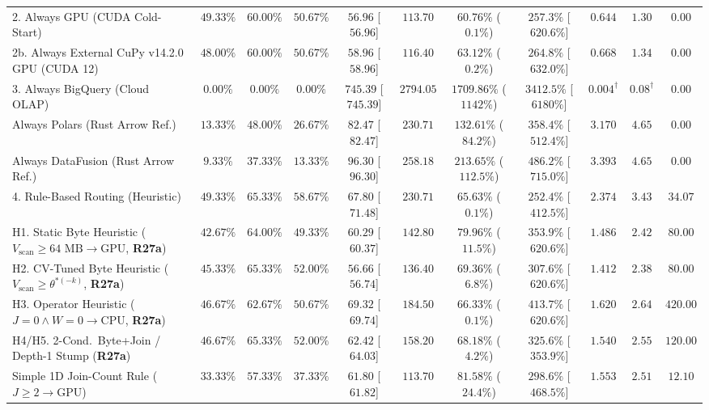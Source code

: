 \documentclass[10pt,a4paper]{article}
\newenvironment{fitasttable}{%
  \begin{lrbox}{\asttblbox}%
}{%
  \end{lrbox}%
  \sbox{\asttblboxB}{%
    \ifdim\wd\asttblbox>0.96\textwidth
      \resizebox{0.96\textwidth}{!}{\usebox{\asttblbox}}%
    \else
      \usebox{\asttblbox}%
    \fi
  }%
  \ifdim\ht\asttblboxB>0.72\textheight
    \resizebox{!}{0.72\textheight}{\usebox{\asttblboxB}}%
  \else
    \usebox{\asttblboxB}%
  \fi
}
\begin{document}
\begin{table}[!htbp]
\begin{fitasttable}
\begin{tabular}{@{}lcccccccccc@{}}
2. Always GPU (CUDA Cold-Start) & $49.33\%$ & $60.00\%$ & $50.67\%$ & $56.96$ [$56.96$] & $113.70$ & $60.76\%$ ($0.1\%$) & $257.3\%$ [$620.6\%$] & $0.644$ & $1.30$ & $0.00$ \\
2b. Always External CuPy v14.2.0 GPU (CUDA 12) & $48.00\%$ & $60.00\%$ & $50.67\%$ & $58.96$ [$58.96$] & $116.40$ & $63.12\%$ ($0.2\%$) & $264.8\%$ [$632.0\%$] & $0.668$ & $1.34$ & $0.00$ \\
3. Always BigQuery (Cloud OLAP) & $0.00\%$ & $0.00\%$ & $0.00\%$ & $745.39$ [$745.39$] & $2794.05$ & $1709.86\%$ ($1142\%$) & $3412.5\%$ [$6180\%$] & $0.004^{\dagger}$ & $0.08^{\dagger}$ & $0.00$ \\
Always Polars (Rust Arrow Ref.) & $13.33\%$ & $48.00\%$ & $26.67\%$ & $82.47$ [$82.47$] & $230.71$ & $132.61\%$ ($84.2\%$) & $358.4\%$ [$512.4\%$] & $3.170$ & $4.65$ & $0.00$ \\
Always DataFusion (Rust Arrow Ref.) & $9.33\%$ & $37.33\%$ & $13.33\%$ & $96.30$ [$96.30$] & $258.18$ & $213.65\%$ ($112.5\%$) & $486.2\%$ [$715.0\%$] & $3.393$ & $4.65$ & $0.00$ \\
4. Rule-Based Routing (Heuristic) & $49.33\%$ & $65.33\%$ & $58.67\%$ & $67.80$ [$71.48$] & $230.71$ & $65.63\%$ ($0.1\%$) & $252.4\%$ [$412.5\%$] & $2.374$ & $3.43$ & $34.07$ \\
H1. Static Byte Heuristic ($V_{\text{scan}}\ge 64\text{ MB}\rightarrow\text{GPU}$, \textbf{R27a}) & $42.67\%$ & $64.00\%$ & $49.33\%$ & $60.29$ [$60.37$] & $142.80$ & $79.96\%$ ($11.5\%$) & $353.9\%$ [$620.6\%$] & $1.486$ & $2.42$ & $80.00$ \\
H2. CV-Tuned Byte Heuristic ($V_{\text{scan}}\ge \theta^{*(-k)}$, \textbf{R27a}) & $45.33\%$ & $65.33\%$ & $52.00\%$ & $56.66$ [$56.74$] & $136.40$ & $69.36\%$ ($6.8\%$) & $307.6\%$ [$620.6\%$] & $1.412$ & $2.38$ & $80.00$ \\
H3. Operator Heuristic ($J=0\wedge W=0\rightarrow\text{CPU}$, \textbf{R27a}) & $46.67\%$ & $62.67\%$ & $50.67\%$ & $69.32$ [$69.74$] & $184.50$ & $66.33\%$ ($0.1\%$) & $413.7\%$ [$620.6\%$] & $1.620$ & $2.64$ & $420.00$ \\
H4/H5. 2-Cond.\ Byte+Join / Depth-1 Stump (\textbf{R27a}) & $46.67\%$ & $65.33\%$ & $52.00\%$ & $62.42$ [$64.03$] & $158.20$ & $68.18\%$ ($4.2\%$) & $325.6\%$ [$353.9\%$] & $1.540$ & $2.55$ & $120.00$ \\
Simple 1D Join-Count Rule ($J \ge 2 \rightarrow \text{GPU}$) & $33.33\%$ & $57.33\%$ & $37.33\%$ & $61.80$ [$61.82$] & $113.70$ & $81.58\%$ ($24.4\%$) & $298.6\%$ [$468.5\%$] & $1.553$ & $2.51$ & $12.10$ \\

\end{tabular}
\end{fitasttable}
\end{table}
\end{document}
